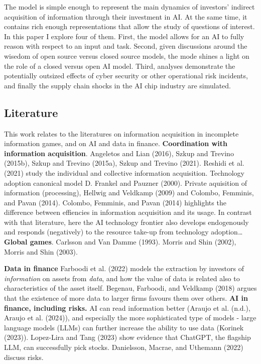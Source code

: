 \documentclass[
]{article}
\theoremstyle{plain}
\theoremstyle{remark}
\begin{document}
The model is simple enough to represent the main dynamics of investors'
indirect acquisition of information through their investment in AI. At
the same time, it contains rich enough representations that allow the
study of questions of interest. In this paper I explore four of them.
First, the model allows for an AI to fully reason with respect to an
input and task. Second, given discussions around the wisedom of open
source versus closed source models, the mode shines a light on the role
of a closed versus open AI model. Third, analyses demonstrate the
potentially outsized effects of cyber security or other operational risk
incidents, and finally the supply chain shocks in the AI chip industry
are simulated.

\hypertarget{literature}{%
\subsection{Literature}\label{literature}}

This work relates to the literatures on information acquisition in
incomplete information games, and on AI and data in finance.
\textbf{Coordination with information acquisition}. Angeletos and Lian
(2016), Szkup and Trevino (2015b), Szkup and Trevino (2015a), Szkup and
Trevino (2021). Reshidi et al. (2021) study the individual and
collective information acquisition. Technology adoption canonical model
D. Frankel and Pauzner (2000). Private aquisition of information
(processing), Hellwig and Veldkamp (2009) and Colombo, Femminis, and
Pavan (2014). Colombo, Femminis, and Pavan (2014) highlights the
difference between effiencies in information acquisition and its usage.
In contrast with that literature, here the AI technology frontier also
develops endogenously and responds (negatively) to the resource take-up
from technology adoption\ldots{} \textbf{Global games}. Carlsson and Van
Damme (1993). Morris and Shin (2002), Morris and Shin (2003).

\textbf{Data in finance} Farboodi et al. (2022) models the extraction by
investors of \emph{information} on assets from \emph{data}, and how the
value of data is related also to characteristics of the asset itself.
Begenau, Farboodi, and Veldkamp (2018) argues that the existence of more
data to larger firms favours them over others. \textbf{AI in finance,
including risks.} AI can read information better (Araujo et al. (n.d.),
Araujo et al. (2024)), and especially the more sophisticated type of
models - large language models (LLMs) can further increase the ability
to use data (Korinek (2023)). Lopez-Lira and Tang (2023) show evidence
that ChatGPT, the flagship LLM, can successfully pick stocks.
Danielsson, Macrae, and Uthemann (2022) discuss risks.
\end{document}
